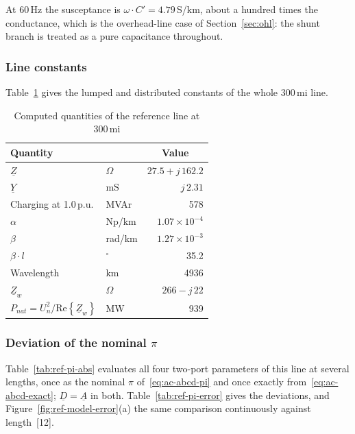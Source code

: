 At 60\,Hz the susceptance is $\omega \cdot C' = 4.79$\,\textmu S/km, about a
hundred times the conductance, which is the overhead-line case of
Section~\ref{sec:ohl}: the shunt branch is treated as a pure capacitance
throughout.

\subsubsection{Line constants}
\label{sec:ref-constants}

Table~\ref{tab:ref-computed} gives the lumped and distributed constants
of the whole 300\,mi line.

\begin{table}[!ht]
  \centering
  \begin{tabular}{@{}l l r@{}}
    \toprule
    \textbf{Quantity} & & \multicolumn{1}{c}{\textbf{Value}} \\
    \midrule
    $\underline{Z}$ & $\Omega$ & $27.5 + j\,162.2$ \\
    $\underline{Y}$ & mS & $j\,2.31$ \\
    Charging at 1.0\,p.u. & MVAr & 578 \\
    \midrule
    $\alpha$ & Np/km & $1.07 \times 10^{-4}$ \\
    $\beta$ & rad/km & $1.27 \times 10^{-3}$ \\
    $\beta \cdot l$ & $^\circ$ & 35.2 \\
    Wavelength & km & 4936 \\
    $\underline{Z}_w$ & $\Omega$ & $266 - j\,22$ \\
    $P_{nat} = U_n^2 / \mathrm{Re}\left\{\underline{Z}_w\right\}$ & MW & 939 \\
    \bottomrule
  \end{tabular}
  \caption{Computed quantities of the reference line at 300\,mi}
  \label{tab:ref-computed}
\end{table}

\subsubsection{Deviation of the nominal $\pi$}
\label{sec:ref-pi-error}

Table~\ref{tab:ref-pi-abs} evaluates all four two-port parameters of this
line at several lengths, once as the nominal $\pi$ of~\eqref{eq:ac-abcd-pi}
and once exactly from~\eqref{eq:ac-abcd-exact}; $\underline{D} =
\underline{A}$ in both. Table~\ref{tab:ref-pi-error} gives the deviations,
and Figure~\ref{fig:ref-model-error}(a) the same comparison continuously
against length~[12].

